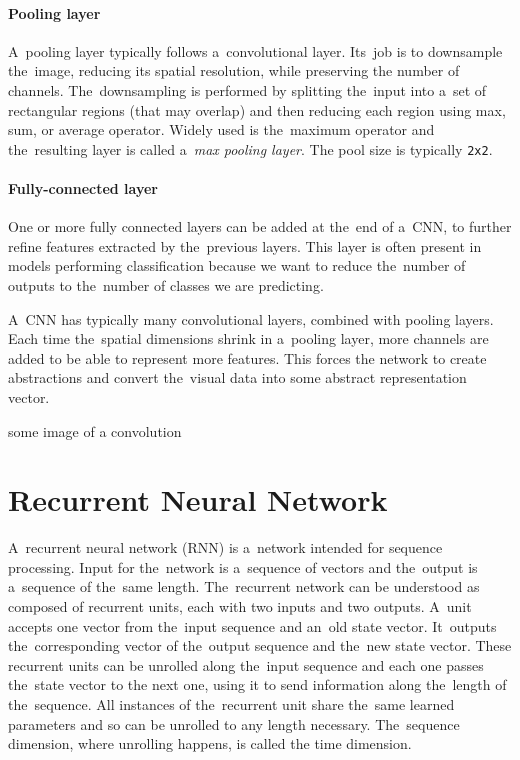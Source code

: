 \paragraph{Pooling layer} A~pooling layer typically follows a~convolutional layer. Its~job is to downsample the~image, reducing its spatial resolution, while preserving the number of channels. The~downsampling is performed by splitting the~input into a~set of rectangular regions (that may overlap) and then reducing each region using max, sum, or average operator. Widely used is the~maximum operator and the~resulting layer is called a~\emph{max pooling layer}. The pool size is typically \texttt{2x2}.

\paragraph{Fully-connected layer} One or more fully connected layers can be added at the~end of a~CNN, to further refine features extracted by the~previous layers. This layer is often present in models performing classification because we want to reduce the~number of outputs to the~number of classes we are predicting.

A~CNN has typically many convolutional layers, combined with pooling layers. Each time the~spatial dimensions shrink in a~pooling layer, more channels are added to be able to represent more features. This forces the network to create abstractions and convert the~visual data into some abstract representation vector.

\begin{code}
some image of a convolution
\end{code}


\section{Recurrent Neural Network}

A~recurrent neural network (RNN) is a~network intended for sequence processing. Input for the~network is a~sequence of vectors and the~output is a~sequence of the~same length. The~recurrent network can be understood as composed of recurrent units, each with two inputs and two outputs. A~unit accepts one vector from the~input sequence and an~old state vector. It~outputs the~corresponding vector of the~output sequence and the~new state vector. These recurrent units can be unrolled along the~input sequence and each one passes the~state vector to the next one, using it to send information along the~length of the~sequence. All instances of the~recurrent unit share the~same learned parameters and so can be unrolled to any length necessary. The~sequence dimension, where unrolling happens, is called the time dimension.

